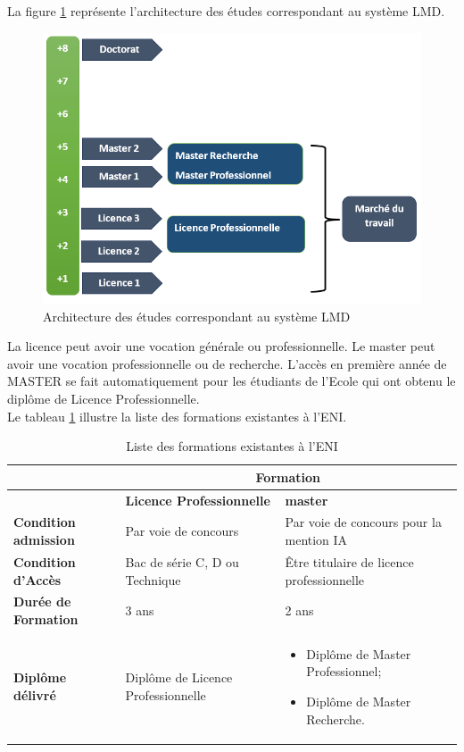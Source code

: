 \documentclass[12pt]{report}
\begin{document}
				La figure \ref{fig:LMD} représente l’architecture des études correspondant au système LMD.

				\begin{figure}[h]
					\centering
					\includegraphics[width=\textwidth]{image5.png}
					\caption{Architecture des études correspondant au système LMD}
					\label{fig:LMD}
				\end{figure}
				\FloatBarrier
				
				La licence peut avoir une vocation générale ou professionnelle. Le master peut avoir une vocation professionnelle ou de recherche. L’accès en première année de MASTER se fait automatiquement pour les étudiants de l’Ecole qui ont obtenu le diplôme de Licence Professionnelle.\\				

				Le tableau \ref{tab:formationsENI} illustre la liste des formations existantes à l’ENI.

				\begin{longtable}{|p{4cm}|p{5cm}|p{5cm}|}
				\caption{Liste des formations existantes à l’ENI}
				\label{tab:formationsENI}\\
				\hline
				  & \multicolumn{2}{|c|}{\textbf{Formation}} \\
				 \hline
				  &  \textbf{Licence Professionnelle} & \textbf{master} \\
				 \hline
				\endfirsthead
				\endhead
				 \textbf{Condition admission} &
				Par voie de concours
				 &  Par voie de concours pour la mention IA\\
				 \hline
			 	\textbf{Condition d’Accès} & Bac de série C, D ou Technique& Être titulaire de licence professionnelle\\					
				\hline
				\textbf{Durée de Formation} & 3 ans & 2 ans\\
				\hline
				\textbf{Diplôme délivré} & Diplôme de Licence Professionnelle &
				\begin{itemize}
					\item Diplôme de Master Professionnel;
					\item Diplôme de Master Recherche.
				\end{itemize}\\
				\hline
				\end{longtable}
				\FloatBarrier				
\end{document}
